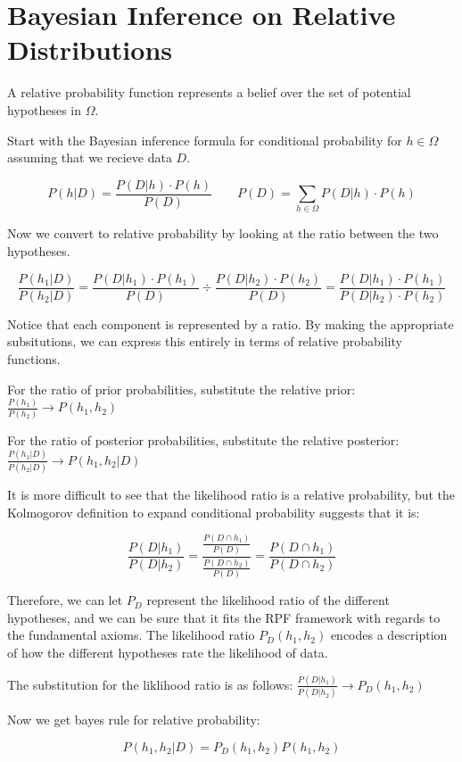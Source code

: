 \documentclass[twoside]{article}
\theoremstyle{plain}%
\theoremstyle{definition}
\theoremstyle{remark}
\begin{document}
\section{Bayesian Inference on Relative Distributions}

A relative probability function represents a belief over the set of potential hypotheses in \(\Omega\).

Start with the Bayesian inference formula for conditional probability for \(h \in \Omega\) assuming that we recieve data \(D\).

\[P(h|D) = \frac{P(D|h) \cdot P(h)}{P(D)} \qquad P(D) = \sum_{h \in \Omega} P(D|h) \cdot P(h)\]

Now we convert to relative probability by looking at the ratio between the two hypotheses.

\[\frac{P(h_1|D)}{P(h_2| D)} = \frac{P(D|h_1) \cdot P(h_1)}{P(D)} \div \frac{P(D|h_2) \cdot P(h_2)}{P(D)} = \frac{P(D|h_1) \cdot P(h_1)}{P(D|h_2) \cdot P(h_2)} \]

Notice that each component is represented by a ratio. By making the appropriate subsitutions, we can express this entirely in terms of relative probability functions.

For the ratio of prior probabilities, substitute the relative prior: \(\frac{P(h_1)}{P(h_2)} \rightarrow P(h_1, h_2) \)

For the ratio of posterior probabilities, substitute the relative posterior: \(\frac{P(h_1|D)}{P(h_2|D)} \rightarrow P(h_1, h_2|D) \)

It is more difficult to see that the likelihood ratio is a relative probability, but the Kolmogorov definition to expand conditional probability suggests that it is:

\[\frac{P(D|h_1)}{P(D|h_2)} = \frac{\frac{P(D \cap h_1)}{P(D)}}{\frac{P(D \cap h_2)}{P(D)}} = \frac{P(D \cap h_1)}{P(D \cap h_2)} \]

Therefore, we can let \(P_D\) represent the likelihood ratio of the different hypotheses, and we can be sure that it fits the RPF framework with regards to the fundamental axioms. The likelihood ratio \(P_D(h_1, h_2)\) encodes a description of how the different hypotheses rate the likelihood of data.

The substitution for the liklihood ratio is as follows: \(\frac{P(D|h_1)}{P(D|h_2)} \rightarrow P_D(h_1, h_2) \)

Now we get bayes rule for relative probability:

 \[P(h_1, h_2|D) = P_D(h_1, h_2) P(h_1, h_2)\]
 
\end{document}
